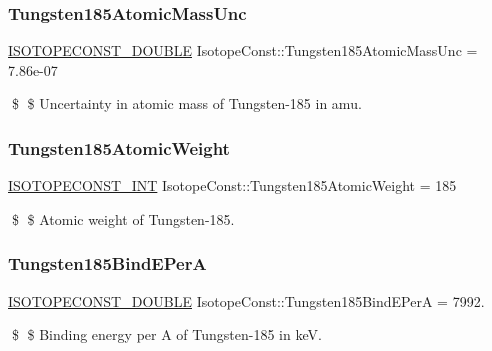 \subsubsection{\texorpdfstring{Tungsten185\+Atomic\+Mass\+Unc}{Tungsten185AtomicMassUnc}}
{\footnotesize\ttfamily \mbox{\hyperlink{group___isotope_const-_macros_ga8f45a7272ce02c0b4c65c44636ed719a}{I\+S\+O\+T\+O\+P\+E\+C\+O\+N\+S\+T\+\_\+\+D\+O\+U\+B\+LE}} Isotope\+Const\+::\+Tungsten185\+Atomic\+Mass\+Unc = 7.\+86e-\/07}

\$ \$ Uncertainty in atomic mass of Tungsten-\/185 in amu. \mbox{\label{group___isotope_const-_tungsten-_w185_gad9a054172667061a9890384566c07503}} 
\subsubsection{\texorpdfstring{Tungsten185\+Atomic\+Weight}{Tungsten185AtomicWeight}}
{\footnotesize\ttfamily \mbox{\hyperlink{group___isotope_const-_macros_ga5f18360b3e99483a35c32d789e62621c}{I\+S\+O\+T\+O\+P\+E\+C\+O\+N\+S\+T\+\_\+\+I\+NT}} Isotope\+Const\+::\+Tungsten185\+Atomic\+Weight = 185}

\$ \$ Atomic weight of Tungsten-\/185. \mbox{\label{group___isotope_const-_tungsten-_w185_ga62408d5f2bf188ec56e9ff52b5ad70c8}} 
\subsubsection{\texorpdfstring{Tungsten185\+Bind\+E\+PerA}{Tungsten185BindEPerA}}
{\footnotesize\ttfamily \mbox{\hyperlink{group___isotope_const-_macros_ga8f45a7272ce02c0b4c65c44636ed719a}{I\+S\+O\+T\+O\+P\+E\+C\+O\+N\+S\+T\+\_\+\+D\+O\+U\+B\+LE}} Isotope\+Const\+::\+Tungsten185\+Bind\+E\+PerA = 7992.}

\$ \$ Binding energy per A of Tungsten-\/185 in keV. \mbox{\label{group___isotope_const-_tungsten-_w185_ga7d9af1209655de303d5a43bd517b5655}} 
